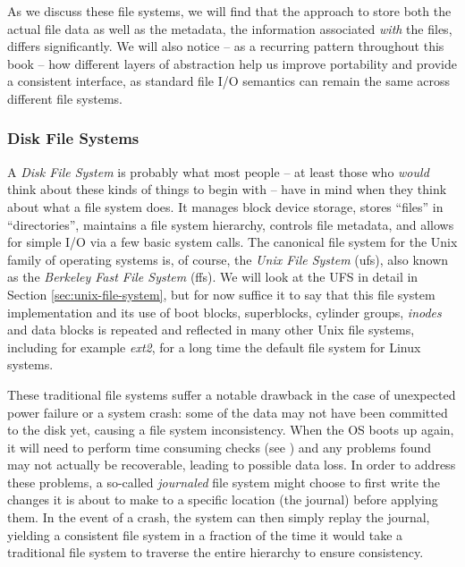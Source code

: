 As we discuss these file systems, we will find that
the approach to store both the actual file data as
well as the metadata, the information associated {\em
with} the files, differs significantly.  We will also
notice -- as a recurring pattern throughout this book
-- how different layers of abstraction help us improve
portability and provide a consistent interface, as
standard file I/O semantics can remain the same across
different file systems.

\subsubsection{Disk File Systems}

A {\em Disk File System} is probably what most people
-- at least those who {\em would} think about these
kinds of things to begin with -- have in mind when they
think about what a file system does.  It manages block
device storage, stores ``files'' in ``directories'',
maintains a file system hierarchy, controls file
metadata, and allows for simple I/O via a few basic
system calls.  The canonical file system for the Unix
family of operating systems is, of course, the {\em
Unix File System} (\gls{ufs}),
also known as the {\em Berkeley Fast File System}
(\gls{ffs}).  We will look at
the UFS in detail in Section
\ref{sec:unix-file-system}, but for now suffice it to
say that this file system implementation and its use
of boot blocks, superblocks, cylinder groups,
{\em inodes} and data blocks is repeated and
reflected in many other Unix file systems, including
for example {\em ext2}, for a
long time the default file system for Linux systems.

These traditional file systems suffer a notable
drawback in the case of unexpected power failure or a
system crash: some of the data may not have been
committed to the disk yet, causing a file system
inconsistency.  When the OS boots up again, it will
need to perform time consuming checks (see
) and any problems found may not
actually be recoverable, leading to possible data
loss.  In order to address these problems, a so-called
{\em journaled} file system might choose to first
write the changes it is about to make to a specific
location (the journal) before applying them.  In the
event of a crash, the system can then simply replay
the journal, yielding a consistent file system in a
fraction of the time it would take a traditional file
system to traverse the entire hierarchy to ensure
consistency.

